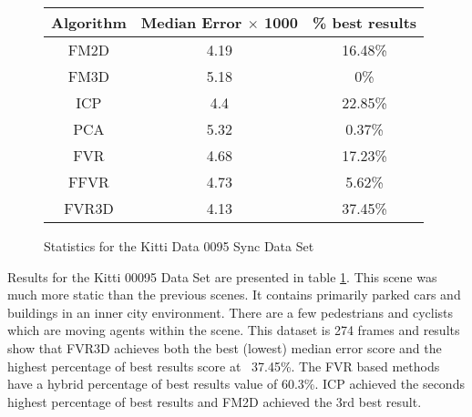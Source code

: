
\begin{figure}
\centering
\begin{tabular}{ccc}
\hline
\textbf{Algorithm} & \textbf{Median Error $\times$ 1000} & \textbf{\% best results}\\ \hline
FM2D	& 4.19 & 16.48\%\\
FM3D	& 5.18 & 0\%\\
ICP	& 4.4 & 22.85\%\\
PCA	& 5.32 & 0.37\%\\
FVR	& 4.68 & 17.23\%\\
FFVR	& 4.73 & 5.62\%\\
FVR3D	& 4.13 & 37.45\%\\
\end{tabular}
\caption{Statistics for the Kitti Data 0095 Sync Data Set}
\label{tab:kittidata0095sync}
\end{figure} 

Results for the Kitti 00095 Data Set are presented in table \ref{tab:kittidata0095sync}. This scene was much more static than the previous scenes. It contains primarily parked cars and buildings in an inner city environment. There are a few pedestrians and cyclists which are moving agents within the scene. This dataset is 274 frames and results show that FVR3D achieves both the best (lowest) median error score and the highest percentage of best results score at ~37.45\%. The FVR based methods have a hybrid percentage of best results value of 60.3\%. ICP achieved the seconds highest percentage of best results and FM2D achieved the 3rd best result. \\  

